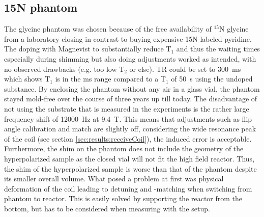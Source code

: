         \subsection{15N phantom}
        The glycine phantom was chosen because of the free availability of $^{15}$N glycine from a laboratory closing in contrast to buying expensive 15N-labeled pyridine. The doping with Magnevist to substantially reduce T$_1$ and thus the waiting times especially during shimming but also doing adjustments worked as intended, with no observed drawbacks (e.g. too low T$_2$ or else). TR could be set to \SI{300}{\milli\second} which shows T$_1$ is in the \si{\milli\second} range compared to a T$_1$ of \SI{50}{\second} using the undoped substance.
            By enclosing the phantom without any air in a glass vial, the phantom stayed mold-free over the course of three years up till today.
            The disadvantage of not using the substrate that is measured in the experiments is the rather large frequency shift of \SI{12000}{\hertz} at \SI{9.4}{\tesla}. This means that adjustments such as flip angle calibration and match are slightly off, considering the wide resonance peak of the coil (see section \ref{sec:results:receiveCoil}), the induced error is acceptable.
            Furthermore, the shim on the phantom does not include the geometry of the hyperpolarized sample as the closed vial will not fit the high field reactor. Thus, the shim of the hyperpolarized sample is worse than that of the phantom despite its smaller overall volume.
            What posed a problem at first was physical deformation of the coil leading to detuning and -matching when switching from phantom to reactor. This is easily solved by supporting the reactor from the bottom, but has to be considered when measuring with the setup.
